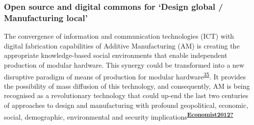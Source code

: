 \documentclass[
  12pt,
  a4paperpaper,
  onecolumn]{article}
\begin{document}
\hypertarget{open-source-and-digital-commons-for-design-global-manufacturing-local}{%
\subsubsection{Open source and digital commons for `Design global /
Manufacturing
local'}\label{open-source-and-digital-commons-for-design-global-manufacturing-local}}

The convergence of information and communication technologies (ICT) with
digital fabrication capabilities of Additive Manufacturing (AM) is
creating the appropriate knowledge-based social environments that enable
independent production of modular hardware. This synergy could be
transformed into a new disruptive paradigm of means of production for
modular
hardware\textsuperscript{\protect\hyperlink{ref-Kostakis2013}{35}}. It
provides the possibility of mass diffusion of this technology, and
consequently, AM is being recognised as a revolutionary technology that
could up-end the last two centuries of approaches to design and
manufacturing with profound geopolitical, economic, social, demographic,
environmental and security
implications\textsuperscript{\protect\hyperlink{ref-Economist2012}{\textbf{Economist2012?}}}
\end{document}
